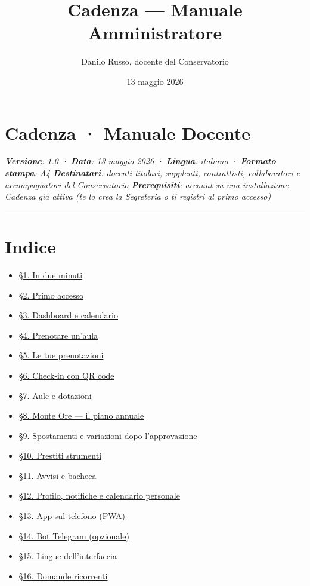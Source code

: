 \documentclass[11pt,a4paper]{article}
\title{Cadenza --- Manuale Amministratore}
\author{Danilo Russo, docente del Conservatorio}
\date{13 maggio 2026}
\renewenvironment{quote}
  {\begin{list}{}{%
      \setlength{\leftmargin}{8pt}%
      \setlength{\rightmargin}{8pt}%
      \setlength{\topsep}{6pt}%
      \setlength{\parsep}{0pt}}%
      \item\relax\color{black!75}\itshape}
  {\end{list}}
\begin{document}
\maketitle
\thispagestyle{fancy}

\tableofcontents
\clearpage

\section*{Cadenza · Manuale Docente}


\begin{quote}
\textbf{Versione}: 1.0 · \textbf{Data}: 13 maggio 2026 · \textbf{Lingua}: italiano · \textbf{Formato stampa}: A4 \textbf{Destinatari}: docenti titolari, supplenti, contrattisti, collaboratori e accompagnatori del Conservatorio \textbf{Prerequisiti}: account su una installazione Cadenza già attiva (te lo crea la Segreteria o ti registri al primo accesso)
\end{quote}

\medskip\hrule\medskip

\section{Indice}


\begin{itemize}
  \item \href{\#1-in-due-minuti}{§1. In due minuti}
  \item \href{\#2-primo-accesso}{§2. Primo accesso}
  \item \href{\#3-dashboard-e-calendario}{§3. Dashboard e calendario}
  \item \href{\#4-prenotare-unaula}{§4. Prenotare un'aula}
  \item \href{\#5-le-tue-prenotazioni}{§5. Le tue prenotazioni}
  \item \href{\#6-check-in-con-qr-code}{§6. Check-in con QR code}
  \item \href{\#7-aule-e-dotazioni}{§7. Aule e dotazioni}
  \item \href{\#8-monte-ore--il-piano-annuale}{§8. Monte Ore — il piano annuale}
  \item \href{\#9-spostamenti-e-variazioni-dopo-lapprovazione}{§9. Spostamenti e variazioni dopo l'approvazione}
  \item \href{\#10-prestiti-strumenti}{§10. Prestiti strumenti}
  \item \href{\#11-avvisi-e-bacheca}{§11. Avvisi e bacheca}
  \item \href{\#12-profilo-notifiche-e-calendario-personale}{§12. Profilo, notifiche e calendario personale}
  \item \href{\#13-app-sul-telefono-pwa}{§13. App sul telefono (PWA)}
  \item \href{\#14-bot-telegram-opzionale}{§14. Bot Telegram (opzionale)}
  \item \href{\#15-lingue-dellinterfaccia}{§15. Lingue dell'interfaccia}
  \item \href{\#16-domande-ricorrenti}{§16. Domande ricorrenti}
\end{itemize}
\end{document}
